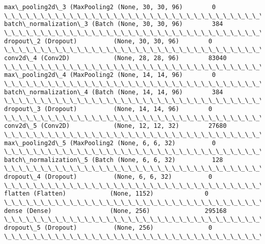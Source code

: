\documentclass[11pt]{uc3mpracticas}
\begin{document}
\begin{Verbatim}[commandchars=\\\{\}]
max\_pooling2d\_3 (MaxPooling2 (None, 30, 30, 96)        0
\_\_\_\_\_\_\_\_\_\_\_\_\_\_\_\_\_\_\_\_\_\_\_\_\_\_\_\_\_\_\_\_\_\_\_\_\_\_\_\_\_\_\_\_\_\_\_\_\_\_\_\_\_\_\_\_\_\_\_\_\_\_\_\_\_
batch\_normalization\_3 (Batch (None, 30, 30, 96)        384
\_\_\_\_\_\_\_\_\_\_\_\_\_\_\_\_\_\_\_\_\_\_\_\_\_\_\_\_\_\_\_\_\_\_\_\_\_\_\_\_\_\_\_\_\_\_\_\_\_\_\_\_\_\_\_\_\_\_\_\_\_\_\_\_\_
dropout\_2 (Dropout)          (None, 30, 30, 96)        0
\_\_\_\_\_\_\_\_\_\_\_\_\_\_\_\_\_\_\_\_\_\_\_\_\_\_\_\_\_\_\_\_\_\_\_\_\_\_\_\_\_\_\_\_\_\_\_\_\_\_\_\_\_\_\_\_\_\_\_\_\_\_\_\_\_
conv2d\_4 (Conv2D)            (None, 28, 28, 96)        83040
\_\_\_\_\_\_\_\_\_\_\_\_\_\_\_\_\_\_\_\_\_\_\_\_\_\_\_\_\_\_\_\_\_\_\_\_\_\_\_\_\_\_\_\_\_\_\_\_\_\_\_\_\_\_\_\_\_\_\_\_\_\_\_\_\_
max\_pooling2d\_4 (MaxPooling2 (None, 14, 14, 96)        0
\_\_\_\_\_\_\_\_\_\_\_\_\_\_\_\_\_\_\_\_\_\_\_\_\_\_\_\_\_\_\_\_\_\_\_\_\_\_\_\_\_\_\_\_\_\_\_\_\_\_\_\_\_\_\_\_\_\_\_\_\_\_\_\_\_
batch\_normalization\_4 (Batch (None, 14, 14, 96)        384
\_\_\_\_\_\_\_\_\_\_\_\_\_\_\_\_\_\_\_\_\_\_\_\_\_\_\_\_\_\_\_\_\_\_\_\_\_\_\_\_\_\_\_\_\_\_\_\_\_\_\_\_\_\_\_\_\_\_\_\_\_\_\_\_\_
dropout\_3 (Dropout)          (None, 14, 14, 96)        0
\_\_\_\_\_\_\_\_\_\_\_\_\_\_\_\_\_\_\_\_\_\_\_\_\_\_\_\_\_\_\_\_\_\_\_\_\_\_\_\_\_\_\_\_\_\_\_\_\_\_\_\_\_\_\_\_\_\_\_\_\_\_\_\_\_
conv2d\_5 (Conv2D)            (None, 12, 12, 32)        27680
\_\_\_\_\_\_\_\_\_\_\_\_\_\_\_\_\_\_\_\_\_\_\_\_\_\_\_\_\_\_\_\_\_\_\_\_\_\_\_\_\_\_\_\_\_\_\_\_\_\_\_\_\_\_\_\_\_\_\_\_\_\_\_\_\_
max\_pooling2d\_5 (MaxPooling2 (None, 6, 6, 32)          0
\_\_\_\_\_\_\_\_\_\_\_\_\_\_\_\_\_\_\_\_\_\_\_\_\_\_\_\_\_\_\_\_\_\_\_\_\_\_\_\_\_\_\_\_\_\_\_\_\_\_\_\_\_\_\_\_\_\_\_\_\_\_\_\_\_
batch\_normalization\_5 (Batch (None, 6, 6, 32)          128
\_\_\_\_\_\_\_\_\_\_\_\_\_\_\_\_\_\_\_\_\_\_\_\_\_\_\_\_\_\_\_\_\_\_\_\_\_\_\_\_\_\_\_\_\_\_\_\_\_\_\_\_\_\_\_\_\_\_\_\_\_\_\_\_\_
dropout\_4 (Dropout)          (None, 6, 6, 32)          0
\_\_\_\_\_\_\_\_\_\_\_\_\_\_\_\_\_\_\_\_\_\_\_\_\_\_\_\_\_\_\_\_\_\_\_\_\_\_\_\_\_\_\_\_\_\_\_\_\_\_\_\_\_\_\_\_\_\_\_\_\_\_\_\_\_
flatten (Flatten)            (None, 1152)              0
\_\_\_\_\_\_\_\_\_\_\_\_\_\_\_\_\_\_\_\_\_\_\_\_\_\_\_\_\_\_\_\_\_\_\_\_\_\_\_\_\_\_\_\_\_\_\_\_\_\_\_\_\_\_\_\_\_\_\_\_\_\_\_\_\_
dense (Dense)                (None, 256)               295168
\_\_\_\_\_\_\_\_\_\_\_\_\_\_\_\_\_\_\_\_\_\_\_\_\_\_\_\_\_\_\_\_\_\_\_\_\_\_\_\_\_\_\_\_\_\_\_\_\_\_\_\_\_\_\_\_\_\_\_\_\_\_\_\_\_
dropout\_5 (Dropout)          (None, 256)               0
\_\_\_\_\_\_\_\_\_\_\_\_\_\_\_\_\_\_\_\_\_\_\_\_\_\_\_\_\_\_\_\_\_\_\_\_\_\_\_\_\_\_\_\_\_\_\_\_\_\_\_\_\_\_\_\_\_\_\_\_\_\_\_\_\_

\end{Verbatim}
\end{document}
